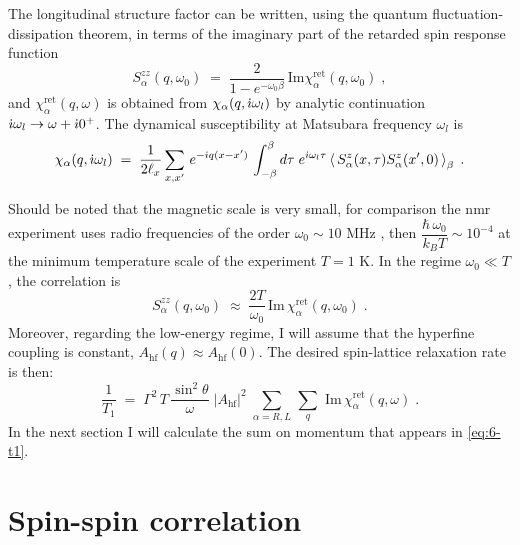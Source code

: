 The longitudinal structure factor can be written, using the quantum fluctuation-dissipation theorem, in terms of the imaginary part of the retarded spin response function 
\begin{equation}
    S^{zz}_{\alpha}(q,\omega_0) \; = \; \frac{2}{1-e^{-\omega_0\beta}} \, \text{Im} \chi^{\text{ret}}_{\alpha}(q,\omega_0) \; ,%
\end{equation}
and $\chi^{\text{ret}}_{\alpha}(q,\omega) $ is obtained from $\chi_{\alpha}(q,\dot{\imath} \omega_l) $ by analytic continuation $\dot{\imath} \omega_l \to \omega + \dot{\imath} 0^{+}$. The dynamical susceptibility at Matsubara frequency $\omega_l$ is
\begin{equation}
    \chi_{\alpha}(q, \dot{\imath} \omega_l ) \; = \;  \frac{1}{2\ell_x}\sum_{x,x'} \, e^{-\dot{\imath} q (x-x')}\, \int_{-\beta }^{\beta}  d\tau \; e^{\dot{\imath} \omega_l \tau  }   \left\langle \,  S_{\alpha}^{z}(x,\tau) S_{\alpha}^{z}(x',0) \,  \right\rangle_{\beta} \; . \label{eq:6-spin-dynamical-susc-momentum}
\end{equation}

Should be noted that the magnetic scale is very small, for comparison the \acrshort{nmr} experiment uses radio frequencies of the order $\omega_{0} \sim 10 \text{ MHz}$ \cite{Baek2017}, then $\dfrac{\hbar \, \omega_0}{k_B T} \sim 10^{-4}$ at the minimum temperature scale of the experiment $T = 1\text{ K}$.   In the regime $\omega_0 \ll T$, the correlation is 
\begin{equation}
    S^{zz}_{\alpha}(q,\omega_0) \;  \approx \;  \frac{2 T}{\omega_0} \, \text{Im} \, \chi^{\text{ret}}_{\alpha}(q,\omega_0) \; .
\end{equation}
Moreover, regarding the low-energy regime, I will assume that the hyperfine coupling is constant, $A_{\text{hf}}(q) \approx A_{\text{hf}}(0)$. The desired spin-lattice relaxation rate is then:
\begin{equation}
    \frac{1}{T_1} \; = \; \Gamma^2 \, T \, \frac{\sin^2 \theta}{\omega} \; \vert A_{\text{hf}}\vert^2 \; \sum_{\alpha = R,L} \, \sum_{q} \,  \,  \text{Im} \, \chi^{\text{ret}}_{\alpha}(q,\omega) \; . \label{eq:6-t1}
\end{equation}
In the next section I will calculate the sum on momentum that appears in \eqref{eq:6-t1}.

\section{Spin-spin correlation}

